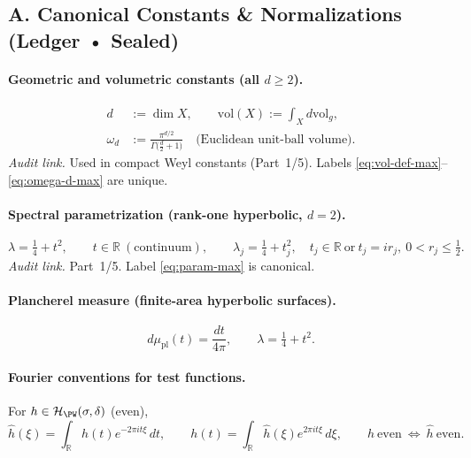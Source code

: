 \subsection*{A. Canonical Constants \& Normalizations (Ledger • Sealed)}
\label{subsec:constants-max}

\paragraph{Geometric and volumetric constants (all $d\ge 2$).}
\begin{align}
  d &:= \dim X, \qquad
  \mathrm{vol}(X) := \int_X d\mathrm{vol}_g, \label{eq:vol-def-max}\\
  \omega_d &:= \frac{\pi^{d/2}}{\Gamma\!\big(\frac d2 + 1\big)} \quad \text{(Euclidean unit-ball volume).}
  \label{eq:omega-d-max}
\end{align}
\textit{Audit link.} Used in compact Weyl constants (Part~1/5). Labels \eqref{eq:vol-def-max}–\eqref{eq:omega-d-max} are unique.

\paragraph{Spectral parametrization (rank-one hyperbolic, $d=2$).}
\begin{equation}
  \lambda=\tfrac14+t^2,\qquad t\in\mathbb R\ (\text{continuum}),\qquad
  \lambda_j=\tfrac14+t_j^2,\quad t_j\in\mathbb R\ \text{or}\ t_j=ir_j,\ 0<r_j\le\tfrac12.
  \label{eq:param-max}
\end{equation}
\textit{Audit link.} Part~1/5. Label \eqref{eq:param-max} is canonical.

\paragraph{Plancherel measure (finite-area hyperbolic surfaces).}
\begin{equation}
  d\mu_{\mathrm{pl}}(t)=\frac{dt}{4\pi},\qquad \lambda=\tfrac14+t^2.
  \label{eq:plancherel-max}
\end{equation}

\paragraph{Fourier conventions for test functions.}
For $h\in\mathcal H_{\PW}(\sigma,\delta)$ (even),
\begin{equation}
  \hat h(\xi)=\int_{\mathbb R} h(t)e^{-2\pi i t \xi}\,dt,\qquad
  h(t)=\int_{\mathbb R} \hat h(\xi)e^{2\pi i t \xi}\,d\xi,\qquad
  h\ \text{even}\ \Leftrightarrow\ \hat h\ \text{even}.
  \label{eq:fourier-max}
\end{equation}

